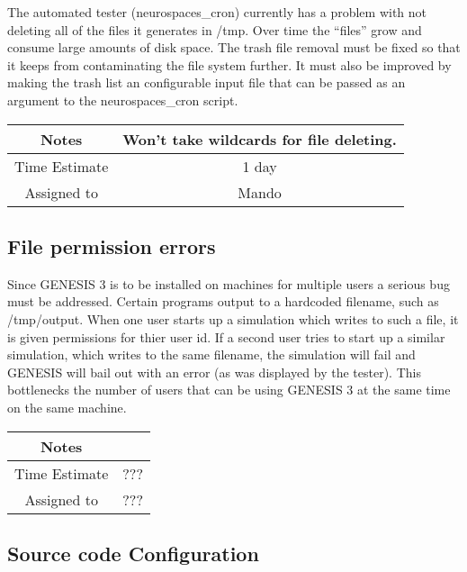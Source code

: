 \documentclass[12pt]{article}
\begin{document}
The automated tester (neurospaces\_cron) currently has a problem with 
not deleting all of the files it generates in /tmp. Over time the 
``files'' grow and consume large amounts of disk space. The trash file 
removal must be fixed so that it keeps from contaminating the file system
further. It must also be improved by making the trash list an configurable 
input file that can be passed as an argument to the neurospaces\_cron script.

{
  \vspace{5mm}
  \centering
  \begin{tabular}{|c|c|}
    \hline
    Notes
    & Won't take wildcards for file deleting. \\
    \hline
    Time Estimate
    & 1 day \\
    \hline
    Assigned to
    & Mando \\
    \hline
  \end{tabular}
}




\subsection{File permission errors}

Since GENESIS 3 is to be installed on machines for multiple users
a serious bug must be addressed. Certain programs output to a hardcoded
filename, such as /tmp/output. When one user starts up a simulation which 
writes to such a file, it is given permissions for thier user id. If a 
second user tries to start up a similar simulation, which writes to the 
same filename, the simulation will fail and GENESIS will bail out with an
error (as was displayed by the tester). This bottlenecks the number of 
users that can be using GENESIS 3 at the same time on the same machine.


{
  \vspace{5mm}
  \centering
  \begin{tabular}{|c|c|}
    \hline
    Notes
    &  \\
    \hline
    Time Estimate
    & ??? \\
    \hline
    Assigned to
    & ??? \\
    \hline
  \end{tabular}
}


\subsection{Source code Configuration}
\end{document}
